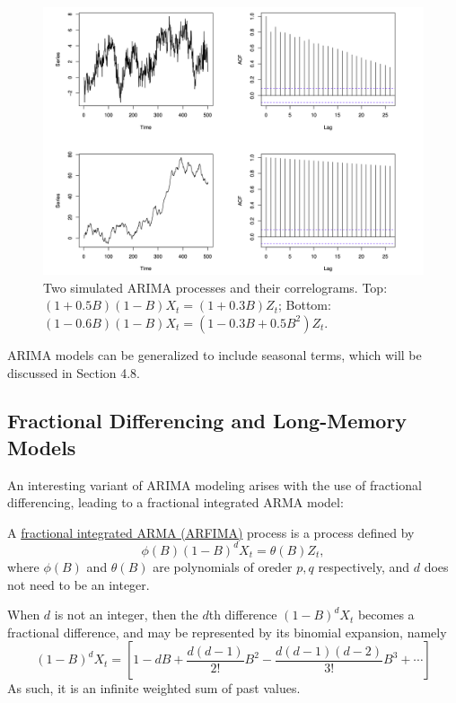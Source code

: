\begin{figure}[ht]
	\centering
	\includegraphics[width=\textwidth]{Chapter 3/fig3-7.png}
	\caption{Two simulated ARIMA processes and their correlograms. Top: $(1 + 0.5B)(1-B)X_t = (1 + 0.3B)Z_t$; 
	Bottom: $(1 - 0.6B)(1 - B)X_t = (1 - 0.3B + 0.5B^2)Z_t$.}
	\label{fig:3.7}
\end{figure}

ARIMA models can be generalized to include seasonal terms, which will be discussed in Section 4.8.



\subsection{Fractional Differencing and Long-Memory Models}
An interesting variant of ARIMA modeling arises with the use of fractional differencing, leading to a fractional 
integrated ARMA model:
\begin{definition*}[]
A \underline{fractional integrated ARMA (ARFIMA)} process is a process defined by 
\[ \phi(B)(1 - B)^d X_t = \theta(B) Z_t, \]
where $\phi(B)$ and $\theta(B)$ are polynomials of oreder $p, q$ respectively, and $d$ does not need to be an 
integer.
\end{definition*}

When $d$ is not an integer, then the $d$th difference $(1 - B)^d X_t$ becomes a fractional difference, and may 
be represented by its binomial expansion, namely 
\[ (1 - B)^d X_t = \left[ 1 - dB + \frac{d(d - 1)}{2!}B^2 - \frac{d(d-1)(d-2)}{3!}B^3 + \cdots \right] \]
As such, it is an infinite weighted sum of past values.

